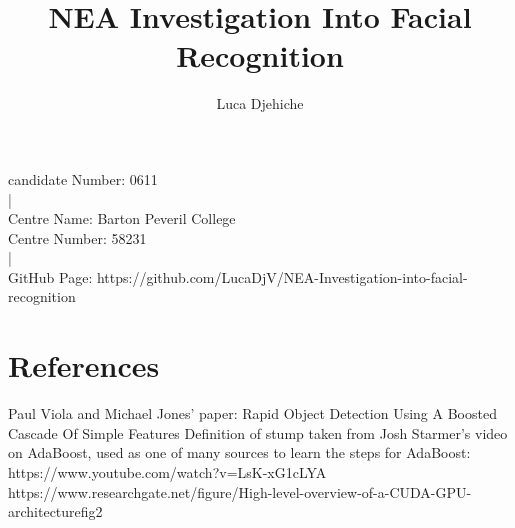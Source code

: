 \documentclass{article}
\title{\textbf{NEA Investigation Into Facial Recognition}}
\author{Luca Djehiche}
\date{}
\begin{document}
\maketitle
\begin{center}candidate Number: 0611
\\
   |
\\
Centre Name: Barton Peveril College
\\
Centre Number: 58231
\\
|
\\
GitHub Page: https://github.com/LucaDjV/NEA-Investigation-into-facial-recognition
\end{center}
\newpage
\tableofcontents
\newpage



\newpage












\section{\textbf{References}}
\begin{thebibliography}{}
Paul Viola and Michael Jones' paper: Rapid Object Detection Using A    Boosted Cascade Of Simple Features
Definition of stump taken from Josh Starmer's video on AdaBoost, used as one of many sources to learn the steps for AdaBoost: https://www.youtube.com/watch?v=LsK-xG1cLYA
https://www.researchgate.net/figure/High-level-overview-of-a-CUDA-GPU-architecture\textunderscore fig2

\end{thebibliography}
\end{document}
